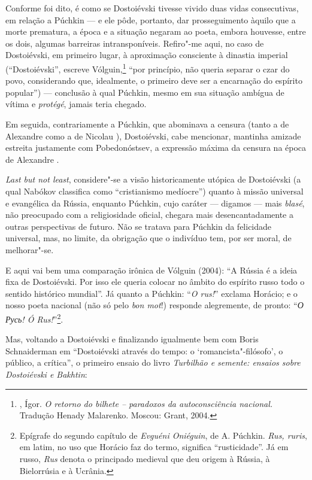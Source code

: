 Conforme foi dito, é como se Dostoiévski tivesse vivido duas vidas
consecutivas, em relação a Púchkin --- e ele pôde, portanto, dar
prosseguimento àquilo que a morte prematura, a época e a situação
negaram ao poeta, embora houvesse, entre os dois, algumas
barreiras intransponíveis. Refiro"-me aqui, no caso de
Dostoiévski, em primeiro lugar, à aproximação consciente
à dinastia imperial (``Dostoiévski'', escreve
Vólguin,\footnote{, Ígor. \emph{O
retorno do bilhete -- paradoxos da autoconsciência
nacional.} Tradução Henady Malarenko. Moscou: Grant, 2004.} ``por
princípio, não queria separar o czar do povo, considerando que,
idealmente, o primeiro deve ser a encarnação do espírito popular'') --- conclusão à qual Púchkin, mesmo em sua situação ambígua de vítima e \emph{protégé}, jamais teria chegado.

Em seguida, contrariamente a Púchkin, que abominava a censura
(tanto a de Alexandre  como a de Nicolau ),
Dostoiévski, cabe mencionar, mantinha amizade estreita justamente com Pobedonóstsev, a expressão máxima da censura na época de Alexandre .

\emph{Last but not least}, considere"-se a visão historicamente utópica de Dostoiévski (a qual
Nabókov classifica como ``cristianismo medíocre'') quanto à
missão universal e evangélica da Rússia, enquanto Púchkin, cujo
caráter --- digamos --- mais \emph{blasé}, não preocupado com a
religiosidade oficial, chegara mais desencantadamente a outras
perspectivas de futuro. Não se tratava para Púchkin da felicidade
universal, mas, no limite, da obrigação que o indivíduo tem, por
ser moral, de melhorar"-se.

E aqui vai bem uma comparação irônica de Vólguin (2004): ``A
Rússia é a ideia fixa de Dostoiévski. Por isso ele queria colocar no
âmbito do espírito russo todo o sentido histórico mundial''.
Já quanto a Púchkin: ``\emph{O rus!}'' exclama Horácio; e o nosso poeta nacional (não só pelo \emph{bon mot}!) responde alegremente, de pronto: ``\emph{О Русь! Ó Rus!}''\footnote{Epígrafe do segundo capítulo de \emph{Evguéni Oniéguin}, de A. Púchkin. \emph{Rus, ruris}, em latim, no uso que Horácio faz do termo, significa ``rusticidade''. Já em russo, \emph{Rus} denota o principado medieval que deu origem à Rússia, à Bielorrúsia e à Ucrânia.}.

Mas, voltando a Dostoiévski e finalizando igualmente bem com Boris
Schnaiderman em ``Dostoiévski através do tempo: o
`romancista"-filósofo', o público, a crítica'', o primeiro
ensaio do livro \emph{Turbilhão e semente: ensaios sobre
Dostoiévski e Bakhtin}:

